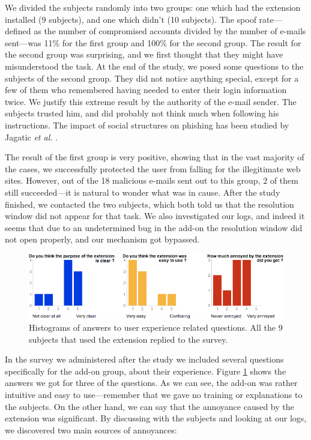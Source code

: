\documentclass[11pt,styles/chicago]{article}
\begin{document}
We divided the subjects randomly into two groups: one which had the extension installed (9 subjects), and one which didn't (10 subjects). The spoof rate---defined as the number of compromised accounts divided by the number of e-mails sent---was 11\% for the first group and 100\% for the second group. The result for the second group was surprising, and we first thought that they might have misunderstood the task. At the end of the study, we posed some questions to the subjects of the second group. They did not notice anything special, except for a few of them who remembered having needed to enter their login information twice. We justify this extreme result by the authority of the e-mail sender. The subjects trusted him, and did probably not think much when following his instructions. The impact of social structures on phishing has been studied by Jagatic \emph{et al.} \cite{jagatic2007social}.

The result of the first group is very positive, showing that in the vast majority of the cases, we successfully protected the user from falling for the illegitimate web sites. However, out of the 18 malicious e-mails sent out to this group, 2 of them still succeeded---it is natural to wonder what was in cause. After the study finished, we contacted the two subjects, which both told us that the resolution window did not appear for that task. We also investigated our logs, and indeed it seems that due to an undetermined bug in the add-on the resolution window did not open properly, and our mechanism got bypassed.

\begin{figure}[t]
  \includegraphics[width=\textwidth]{figures/experience.png}
  \caption{Histograms of answers to user experience related questions. All the 9 subjects that used the extension replied to the survey.}
  \label{fig:experiences}
\end{figure}

In the survey we administered after the study we included several questions specifically for the add-on group, about their experience. Figure \ref{fig:experiences} shows the answers we got for three of the questions. As we can see, the add-on was rather intuitive and easy to use---remember that we gave no training or explanations to the subjects. On the other hand, we can say that the annoyance caused by the extension was significant. By discussing with the subjects and looking at our logs, we discovered two main sources of annoyances:
\end{document}
